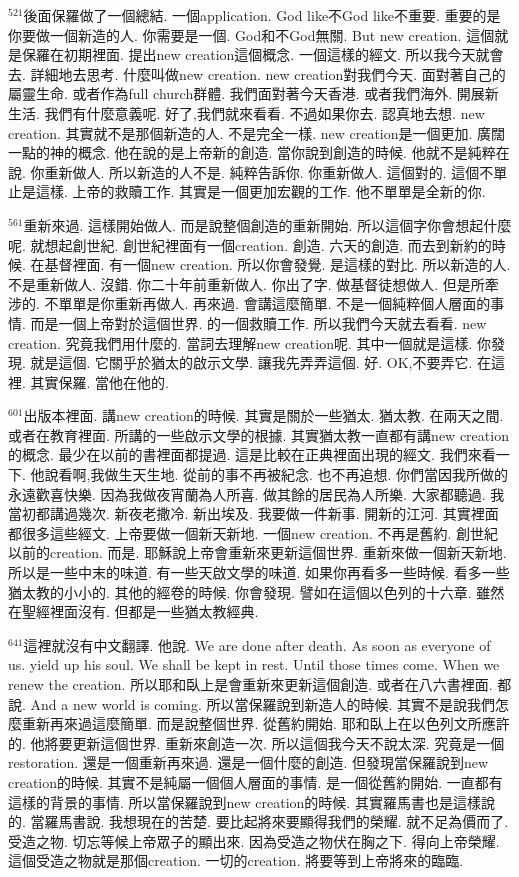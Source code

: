 \documentclass{book}
\begin{document}
$^{521}$後面保羅做了一個總結.
一個application.
God like不God like不重要.
重要的是你要做一個新造的人.
你需要是一個.
God和不God無關.
But new creation.
這個就是保羅在初期裡面.
提出new creation這個概念.
一個這樣的經文.
所以我今天就會去.
詳細地去思考.
什麼叫做new creation.
new creation對我們今天.
面對著自己的屬靈生命.
或者作為full church群體.
我們面對著今天香港.
或者我們海外.
開展新生活.
我們有什麼意義呢.
好了,我們就來看看.
不過如果你去.
認真地去想.
new creation.
其實就不是那個新造的人.
不是完全一樣.
new creation是一個更加.
廣闊一點的神的概念.
他在說的是上帝新的創造.
當你說到創造的時候.
他就不是純粹在說.
你重新做人.
所以新造的人不是.
純粹告訴你.
你重新做人.
這個對的.
這個不單止是這樣.
上帝的救贖工作.
其實是一個更加宏觀的工作.
他不單單是全新的你.

$^{561}$重新來過.
這樣開始做人.
而是說整個創造的重新開始.
所以這個字你會想起什麼呢.
就想起創世紀.
創世紀裡面有一個creation.
創造.
六天的創造.
而去到新約的時候.
在基督裡面.
有一個new creation.
所以你會發覺.
是這樣的對比.
所以新造的人.
不是重新做人.
沒錯.
你二十年前重新做人.
你出了字.
做基督徒想做人.
但是所牽涉的.
不單單是你重新再做人.
再來過.
會講這麼簡單.
不是一個純粹個人層面的事情.
而是一個上帝對於這個世界.
的一個救贖工作.
所以我們今天就去看看.
new creation.
究竟我們用什麼的.
當詞去理解new creation呢.
其中一個就是這樣.
你發現.
就是這個.
它關乎於猶太的啟示文學.
讓我先弄弄這個.
好.
OK,不要弄它.
在這裡.
其實保羅.
當他在他的.

$^{601}$出版本裡面.
講new creation的時候.
其實是關於一些猶太.
猶太教.
在兩天之間.
或者在教育裡面.
所講的一些啟示文學的根據.
其實猶太教一直都有講new creation的概念.
最少在以前的書裡面都提過.
這是比較在正典裡面出現的經文.
我們來看一下.
他說看啊,我做生天生地.
從前的事不再被紀念.
也不再追想.
你們當因我所做的永遠歡喜快樂.
因為我做夜宵蘭為人所喜.
做其餘的居民為人所樂.
大家都聽過.
我當初都講過幾次.
新夜老撒冷.
新出埃及.
我要做一件新事.
開新的江河.
其實裡面都很多這些經文.
上帝要做一個新天新地.
一個new creation.
不再是舊約.
創世紀以前的creation.
而是.
耶穌說上帝會重新來更新這個世界.
重新來做一個新天新地.
所以是一些中末的味道.
有一些天啟文學的味道.
如果你再看多一些時候.
看多一些猶太教的小小的.
其他的經卷的時候.
你會發現.
譬如在這個以色列的十六章.
雖然在聖經裡面沒有.
但都是一些猶太教經典.

$^{641}$這裡就沒有中文翻譯.
他說.
We are done after death.
As soon as everyone of us.
yield up his soul.
We shall be kept in rest.
Until those times come.
When we renew the creation.
所以耶和臥上是會重新來更新這個創造.
或者在八六書裡面.
都說.
And a new world is coming.
所以當保羅說到新造人的時候.
其實不是說我們怎麼重新再來過這麼簡單.
而是說整個世界.
從舊約開始.
耶和臥上在以色列文所應許的.
他將要更新這個世界.
重新來創造一次.
所以這個我今天不說太深.
究竟是一個restoration.
還是一個重新再來過.
還是一個什麼的創造.
但發現當保羅說到new creation的時候.
其實不是純屬一個個人層面的事情.
是一個從舊約開始.
一直都有這樣的背景的事情.
所以當保羅說到new creation的時候.
其實羅馬書也是這樣說的.
當羅馬書說.
我想現在的苦楚.
要比起將來要顯得我們的榮耀.
就不足為價而了.
受造之物.
切忘等候上帝眾子的顯出來.
因為受造之物伏在胸之下.
得向上帝榮耀.
這個受造之物就是那個creation.
一切的creation.
將要等到上帝將來的臨臨.
\end{document}
